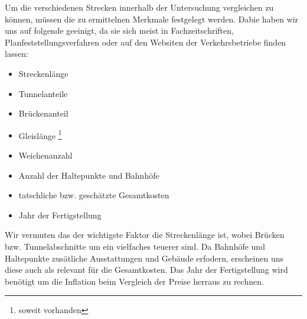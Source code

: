 Um die verschiedenen Strecken innerhalb der Untersuchung vergleichen zu können, müssen die zu ermittelnen Merkmale festgelegt werden. Dabie haben wir uns auf folgende geeinigt, da sie sich meist in Fachzeitschriften, Planfeststellungsverfahren oder auf den Websiten der Verkehrsbetriebe finden lassen:

\begin{itemize}
\item Streckenlänge
\item Tunnelanteile
\item Brückenanteil
\item Gleislänge \footnote{soweit vorhanden}\setcounter{fnnumber}{\thefootnote}
\item Weichenanzahl \footnotemark[\thefnnumber]
\item Anzahl der Haltepunkte und Bahnhöfe
\item tatschliche bzw. geschätzte Gesamtkosten
\item Jahr der Fertigstellung
\end{itemize}

Wir vermuten das der wichtigste Faktor die Streckenlänge ist, wobei Brücken bzw. Tunnelabschnitte um ein vielfaches teuerer sind. Da Bahnhöfe und Haltepunkte zusätliche Ausstattungen und Gebäude erfodern, erscheinen uns diese auch als relevant für die Gesamtkosten. Das Jahr der Fertigstellung wird benötigt um die Inflation beim Vergleich der Preise herraus zu rechnen.

